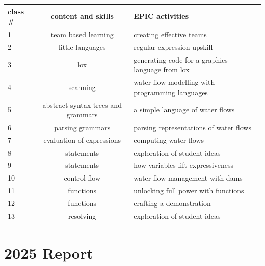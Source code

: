 \documentclass[twoside=false,DIV=14]{scrartcl}
\begin{document}
\begin{tabular}{lcl}
\textbf{class \#} & \textbf{content and skills} & \textbf{EPIC activities} \\
\hline
1 & team based learning  & creating effective teams\\
2 & little languages & regular expression upskill \\
3 & lox & generating code for a graphics language from lox \\
4 & scanning & water flow modelling with programming languages \\
5 & abstract syntax trees and grammars & a simple language of water flows\\
6 & parsing grammars & parsing representations of water flows \\
7 & evaluation of expressions & computing water flows \\
8 & statements & exploration of student ideas \\
9 & statements & how variables lift expressiveness\\
10 & control flow & water flow management with dams \\
11 & functions & unlocking full power with functions \\
12 & functions & crafting a demonstration \\
13 & resolving & exploration of student ideas \\
\hline
\end{tabular}

\newpage

\section*{2025 Report}
\end{document}
